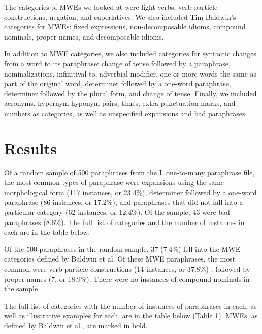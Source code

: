 \documentclass[11pt]{article}
\begin{document}
The categories of MWEs we looked at were light verbs, verb-particle constructions, negation, and superlatives. We also included Tim Baldwin's categories for MWEs: fixed expressions, non-decomposable idioms, compound nominals, proper names, and decomposable idioms. 

In addition to MWE categories, we also included categories for syntactic changes from a word to its paraphrase: change of tense followed by a paraphrase, nominalizations, infinitival to, adverbial modifier, one or more words the same as part of the original word, determiner followed by a one-word paraphrase, determiner followed by the plural form, and change of tense. Finally, we included acronyms, hypernym-hyponym pairs, times, extra punctuation marks, and numbers as categories, as well as unspecified expansions and bad paraphrases.

\section{Results}

Of a random sample of 500 paraphrases from the L one-to-many paraphrase file, the most common types of paraphrase were expansions using the same morphological form (117 instances, or 23.4\%), determiner followed by a one-word paraphrase (86 instances, or 17.2\%), and paraphrases that did not fall into a particular category (62 instances, or 12.4\%). Of the sample, 43 were bad paraphrases (8.6\%). The full list of categories and the number of instances in each are in the table below.  

Of the 500 paraphrases in the random sample, 37 (7.4\%) fell into the MWE categories defined by Baldwin et al. Of these MWE paraphrases, the most common were verb-particle constructions (14 instances, or 37.8\%) , followed by proper names (7, or 18.9\%). There were no instances of compound nominals in the sample.

The full list of categories with the number of instances of paraphrases in each, as well as illustrative examples for each, are in the table below (Table 1). MWEs, as defined by Baldwin et al., are marked in bold. 
\end{document}
